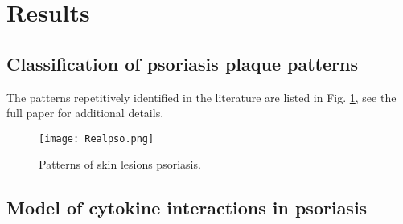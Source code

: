 \section{Results}
\subsection{Classification of psoriasis plaque patterns}
The patterns repetitively identified in the literature are listed in Fig. \ref{fig:1}, see the full paper for additional details.

\begin{figure}[hb]
	\centering
	\texttt{[image: Realpso.png]}
	\caption{Patterns of skin lesions psoriasis.}
	\label{fig:1}
\end{figure}

\subsection{Model of cytokine interactions in psoriasis}
